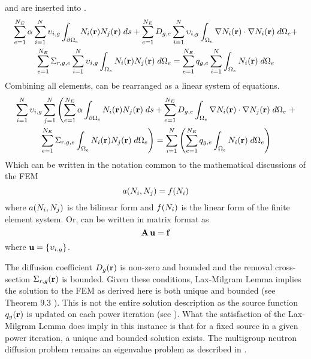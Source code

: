     and  are inserted 
    into .
    \begin{multline}
      \label{eq:this_above}
      \sum_{e=1}^{N_E} \alpha \sum_{i=1}^{N} \upsilon_{i,g}
        \int_{\partial \Omega_e}
        N_i(\mathbf{r})  N_j(\mathbf{r}) \;ds +
        \sum_{e=1}^{N_E} D_{g,e} \sum_{i=1}^{N} \upsilon_{i,g}
        \int_{\Omega_e} \mathbf{\nabla} N_i(\mathbf{r}) \cdot \mathbf{\nabla} N_i(\mathbf{r})\;d\Omega_e
        + \\
        \sum_{e=1}^{N_E} \Sigma_{r,g,e} \sum_{i=1}^{N} \upsilon_{i,g}
        \int_{\Omega_e} N_i(\mathbf{r}) N_j(\mathbf{r}) \; d\Omega_e =
        \sum_{e=1}^{N_E} q_{g,e} \sum_{i=1}^{N} 
        \int_{\Omega_e} N_i(\mathbf{r}) \; d\Omega_e
    \end{multline}
    Combining all elements,  can be rearranged as a linear
    system of equations.
    \begin{multline}
      \label{eq:linear_equation}
      \sum_{i=1}^{N} \upsilon_{i,g} \sum_{j=1}^{N} \left(
        \sum_{e=1}^{N_E} \alpha \int_{\partial \Omega_e}
        N_i(\mathbf{r})  N_j(\mathbf{r}) \;ds +
        \sum_{e=1}^{N_E} D_{g,e} 
        \int_{\Omega_e} \mathbf{\nabla} N_i(\mathbf{r}) \cdot \mathbf{\nabla} N_j(\mathbf{r})\;d\Omega_e
        \right.
        + \\
        \left.
        \sum_{e=1}^{N_E} \Sigma_{r,g,e}
        \int_{\Omega_e} N_i(\mathbf{r}) N_j(\mathbf{r}) \; d\Omega_e \right) =
        \sum_{i=1}^{N} \left(
        \sum_{e=1}^{N_E} q_{g,e} 
        \int_{\Omega_e} N_i(\mathbf{r}) \; d\Omega_e \right)
    \end{multline}
    Which can be written in the notation common to the mathematical discussions 
    of the FEM
      \begin{equation}
        \label{eq:fem_notation}
        a(N_i,N_j) = f(N_i)
      \end{equation}
    where $a(N_i,N_j)$ is the bilinear form and $f(N_i)$ is the 
    linear form of the finite element system.
    Or,  can be written in matrix format as
    \begin{equation}
      \label{eq:matrix_notation}
      \mathbf{A} \, \mathbf{u} = \mathbf{f}
    \end{equation}
    where $\mathbf{u} = \{\upsilon_{i,g}\}$. 
    
    The diffusion coefficient $D_g(\mathbf{r})$ is non-zero and bounded and
    the removal cross-section $\Sigma_{r,g}(\mathbf{r})$ is bounded. Given these
    conditions, Lax-Milgram Lemma implies the solution to the FEM as derived
    here is both unique and bounded (see Theorem 9.3 \cite{textbookli}). This is 
    not the entire solution description as the source function $q_g(\mathbf{r})$ is 
    updated on each power iteration (see ). What the
    satisfaction of the Lax-Milgram Lemma does imply in this instance is that 
    for a fixed source in a given power iteration, a unique and bounded solution
    exists. The multigroup neutron diffusion problem remains an eigenvalue 
    problem as described in \cite{duderstathamilton}. 
    
